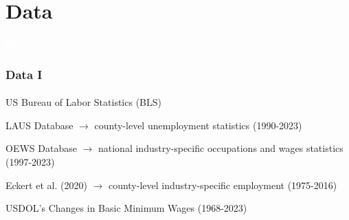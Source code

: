 

\section{Data}

\begin{transitionframe}

    \rmfamily %
    
    \begin{center}
    {\Huge \textbf{\textcolor{white}{Data}}}
    \end{center}
  
\end{transitionframe}

\begin{frame}

    \frametitle{Data I} %
    \framesubtitle{}  %
    \rmfamily %

    \begin{wideitemize}
        \item \textcolor{fgre}{US Bureau of Labor Statistics (BLS)}  
        \vspace{9pt}
        \begin{wideitemize}
            \item[\textcolor{fgre}{\textbullet}] \textcolor{fgre}{LAUS Database} \(\to\) county-level unemployment statistics (1990-2023)
            \item[\textcolor{fgre}{\textbullet}] \textcolor{fgre}{OEWS Database} \(\to\) national industry-specific occupations and wages statistics (1997-2023) %
        \end{wideitemize}
        \item \textcolor{fgre}{Eckert et al. (2020)} \(\to\) county-level industry-specific employment (1975-2016) 
        \item \textcolor{fgre}{USDOL's Changes in Basic Minimum Wages} (1968-2023)
    \end{wideitemize}

\end{frame}


